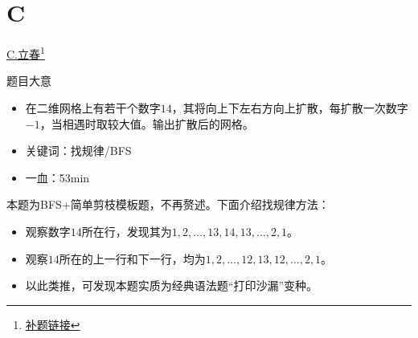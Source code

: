 \documentclass{beamer}
\begin{document}
    \section{C}
    \hypertarget{C}{}
    \begin{frame}{\hyperlink{toc}{C.立春}\footnote{\href{https://acm816.cn/p/238}{\underline{补题链接}}}}
        \begin{block}{题目大意}
            \begin{itemize}
                \item 在二维网格上有若干个数字$14$，其将向上下左右方向上扩散，每扩散一次数字$-1$，当相遇时取较大值。输出扩散后的网格。
                \item 关键词：找规律/BFS
                \item 一血：53min
            \end{itemize}
        \end{block}
        本题为BFS+简单剪枝模板题，不再赘述。下面介绍找规律方法：
        \begin{itemize}
            \item 观察数字$14$所在行，发现其为$1,2,\dots,13,14,13,\dots,2,1$。
            \item 观察$14$所在的上一行和下一行，均为$1,2,\dots,12,13,12,\dots,2,1$。
            \item 以此类推，可发现本题实质为经典语法题“打印沙漏”变种。
        \end{itemize}
    \end{frame}
\end{document}
